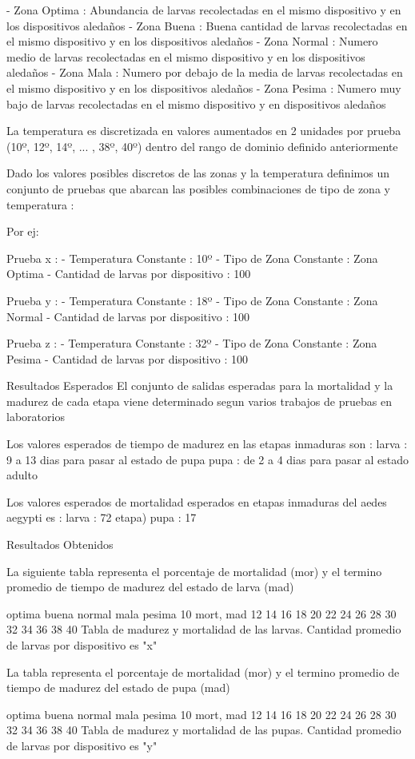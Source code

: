- Zona Optima : Abundancia de larvas recolectadas en el mismo dispositivo
y en los dispositivos aledaños
- Zona Buena : Buena cantidad de larvas recolectadas en el mismo dispositivo
y en los dispositivos aledaños
- Zona Normal : Numero medio de larvas recolectadas en el mismo dispositivo
y en los dispositivos aledaños
- Zona Mala : Numero por debajo de la media de larvas recolectadas en 
el mismo dispositivo y en los dispositivos aledaños
- Zona Pesima : Numero muy bajo de larvas recolectadas en el mismo dispositivo
y en dispositivos aledaños


La temperatura es discretizada en valores aumentados en 2 unidades por 
prueba (10º, 12º, 14º, ... , 38º, 40º) dentro del rango de dominio definido
anteriormente

Dado los valores posibles discretos de las zonas y la temperatura definimos
un conjunto de pruebas que abarcan las posibles combinaciones de tipo 
de zona y temperatura :

Por ej:

Prueba x :
	- Temperatura Constante : 10º
	- Tipo de Zona Constante : Zona Optima
	- Cantidad de larvas por dispositivo : 100

Prueba y :
	- Temperatura Constante : 18º
	- Tipo de Zona Constante : Zona Normal
	- Cantidad de larvas por dispositivo : 100

Prueba z :
	- Temperatura Constante : 32º
	- Tipo de Zona Constante : Zona Pesima
	- Cantidad de larvas por dispositivo : 100


Resultados Esperados 
El conjunto de salidas esperadas para la mortalidad y la madurez de cada
etapa viene determinado segun varios trabajos de pruebas en laboratorios

Los valores esperados de tiempo de madurez en las etapas inmaduras son :
larva : 9 a 13 dias para pasar al estado de pupa
pupa : de 2 a 4 dias para pasar al estado adulto

Los valores esperados de mortalidad esperados en etapas inmaduras del
aedes aegypti es :
larva : 72%
etapa)
pupa : 17%

Resultados Obtenidos

La siguiente tabla representa el porcentaje de mortalidad (mor) y el termino
promedio de tiempo de madurez del estado de larva (mad)

		optima	buena	normal	mala	pesima
10	 mort, mad
12
14
16
18
20
22
24
26
28
30
32
34
36
38
40
Tabla de madurez y mortalidad de las larvas. Cantidad promedio de larvas
por dispositivo es "x"

La tabla representa el porcentaje de mortalidad (mor) y el termino
promedio de tiempo de madurez del estado de pupa (mad)

		optima	buena	normal	mala	pesima
10	 mort, mad
12
14
16
18
20
22
24
26
28
30
32
34
36
38
40
Tabla de madurez y mortalidad de las pupas. Cantidad promedio de larvas
por dispositivo es "y"

